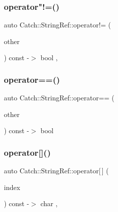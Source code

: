 \mbox{\label{class_catch_1_1_string_ref_aaa6c8bf61c4628034c19763d1c8ad215}} 
\subsubsection{\texorpdfstring{operator"!=()}{operator!=()}}
{\footnotesize\ttfamily auto Catch\+::\+String\+Ref\+::operator!= (\begin{DoxyParamCaption}\item[{\mbox{\hyperlink{class_catch_1_1_string_ref}{String\+Ref}} const \&}]{other }\end{DoxyParamCaption}) const -\/$>$ bool \hspace{0.3cm}{\ttfamily [inline]}, {\ttfamily [noexcept]}}

\mbox{\label{class_catch_1_1_string_ref_aabb30149ab961187e4b3ff3394bf6e73}} 
\subsubsection{\texorpdfstring{operator==()}{operator==()}}
{\footnotesize\ttfamily auto Catch\+::\+String\+Ref\+::operator== (\begin{DoxyParamCaption}\item[{\mbox{\hyperlink{class_catch_1_1_string_ref}{String\+Ref}} const \&}]{other }\end{DoxyParamCaption}) const -\/$>$  bool\hspace{0.3cm}{\ttfamily [noexcept]}}

\mbox{\label{class_catch_1_1_string_ref_a4ba2e01eec1f0f56c257d213c796ab3b}} 
\subsubsection{\texorpdfstring{operator[]()}{operator[]()}}
{\footnotesize\ttfamily auto Catch\+::\+String\+Ref\+::operator\mbox{[}$\,$\mbox{]} (\begin{DoxyParamCaption}\item[{\mbox{\hyperlink{class_catch_1_1_string_ref_a06b4db8fc82b197004291cf370b2ba7c}{size\+\_\+type}}}]{index }\end{DoxyParamCaption}) const -\/$>$ char \hspace{0.3cm}{\ttfamily [inline]}, {\ttfamily [noexcept]}}

